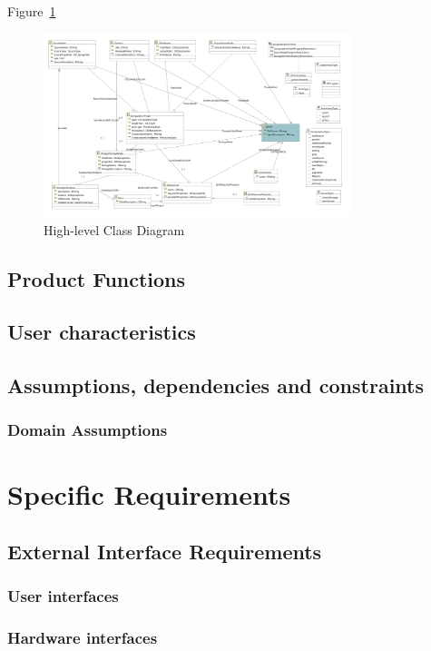 \documentclass[11pt,twoside]{article}
\begin{document}
Figure~\ref{fig:class-diagram} 
\begin{figure}[h!]
    \centering
    \includegraphics[width=0.8\textwidth]{Images/11.png}
    \caption{High-level Class Diagram}
    \label{fig:class-diagram}
\end{figure}

\subsection{Product Functions}

\subsection{User characteristics}

\subsection{Assumptions, dependencies and constraints}

\subsubsection{Domain Assumptions}

\section{Specific Requirements}

\subsection{External Interface Requirements}

\subsubsection{User interfaces}
\subsubsection{Hardware interfaces}
\end{document}
